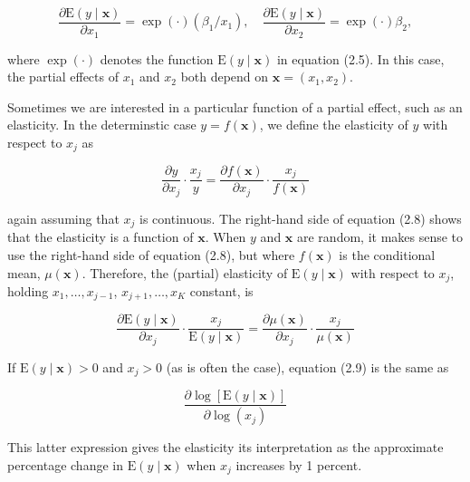 \documentclass[10pt]{article}
\begin{document}
\begin{equation*}
\frac{\partial \mathrm{E}(y \mid \mathbf{x})}{\partial x_{1}}=\exp (\cdot)\left(\beta_{1} / x_{1}\right), \quad \frac{\partial \mathrm{E}(y \mid \mathbf{x})}{\partial x_{2}}=\exp (\cdot) \beta_{2}, \tag{2.7}
\end{equation*}


where $\exp (\cdot)$ denotes the function $\mathrm{E}(y \mid \mathbf{x})$ in equation (2.5). In this case, the partial effects of $x_{1}$ and $x_{2}$ both depend on $\mathbf{x}=\left(x_{1}, x_{2}\right)$.

Sometimes we are interested in a particular function of a partial effect, such as an elasticity. In the determinstic case $y=f(\mathbf{x})$, we define the elasticity of $y$ with respect to $x_{j}$ as


\begin{equation*}
\frac{\partial y}{\partial x_{j}} \cdot \frac{x_{j}}{y}=\frac{\partial f(\mathbf{x})}{\partial x_{j}} \cdot \frac{x_{j}}{f(\mathbf{x})} \tag{2.8}
\end{equation*}


again assuming that $x_{j}$ is continuous. The right-hand side of equation (2.8) shows that the elasticity is a function of $\mathbf{x}$. When $y$ and $\mathbf{x}$ are random, it makes sense to use the right-hand side of equation (2.8), but where $f(\mathbf{x})$ is the conditional mean, $\mu(\mathbf{x})$. Therefore, the (partial) elasticity of $\mathrm{E}(y \mid \mathbf{x})$ with respect to $x_{j}$, holding $x_{1}, \ldots, x_{j-1}$, $x_{j+1}, \ldots, x_{K}$ constant, is


\begin{equation*}
\frac{\partial \mathrm{E}(y \mid \mathbf{x})}{\partial x_{j}} \cdot \frac{x_{j}}{\mathrm{E}(y \mid \mathbf{x})}=\frac{\partial \mu(\mathbf{x})}{\partial x_{j}} \cdot \frac{x_{j}}{\mu(\mathbf{x})} \tag{2.9}
\end{equation*}


If $\mathrm{E}(y \mid \mathbf{x})>0$ and $x_{j}>0$ (as is often the case), equation (2.9) is the same as


\begin{equation*}
\frac{\partial \log [\mathrm{E}(y \mid \mathbf{x})]}{\partial \log \left(x_{j}\right)} \tag{2.10}
\end{equation*}


This latter expression gives the elasticity its interpretation as the approximate percentage change in $\mathrm{E}(y \mid \mathbf{x})$ when $x_{j}$ increases by 1 percent.
\end{document}
